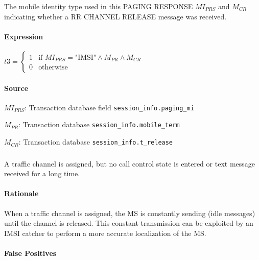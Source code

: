 \documentclass[a4paper,11pt,notitlepage,bigheadings,oneside]{scrartcl}
\begin{document}
The mobile identity type used in this PAGING RESPONSE $MI_{PRS}$ and $M_{CR}$
indicating whether a RR CHANNEL RELEASE message was received.

\paragraph{Expression}


$t3 =
\begin{cases}
	1 & \text{if } MI_{PRS} = \text{"IMSI"} \wedge M_{PR} \wedge M_{CR} \\
	0 & \text{otherwise}
\end{cases}$

\paragraph{Source}

$MI_{PRS}$: Transaction database field \verb|session_info.paging_mi|

$M_{PR}$: Transaction database \verb|session_info.mobile_term|

$M_{CR}$: Transaction database \verb|session_info.t_release|

\subsubsection{}

A traffic channel is assigned, but no call control state is entered or text
message received for a long time.

\paragraph{Rationale}

When a traffic channel is assigned, the MS is constantly sending (idle
messages) until the channel is released. This constant transmission can be
exploited by an IMSI catcher to perform a more accurate localization of the MS.

\paragraph{False Positives}
\end{document}
